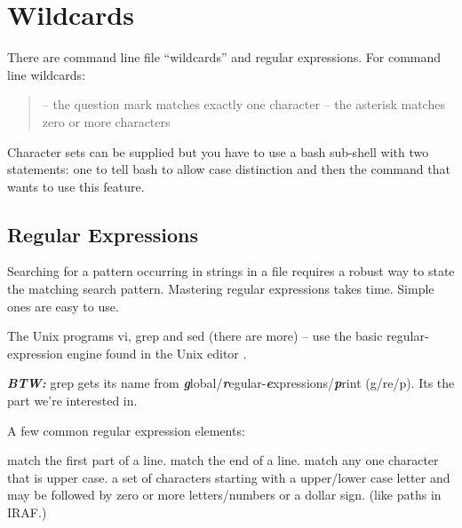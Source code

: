 
\renewcommand{\footerfilename}{extras.tex}


\section{Wildcards}

There are command line file ``wildcards'' and regular expressions. For
command line wildcards:

\begin{quote}
{\color{verbcolor}{\verb#?#}}  -- the question mark matches exactly one character
{\color{verbcolor}{\verb#*#}}  -- the asterisk matches zero or more characters
\end{quote}

Character sets can be supplied but you have to use a bash sub-shell
with two statements: one to tell bash to allow case distinction
{\color{verbcolor}{\verb#LC_ALL=C#}} and then the command that wants
to use this feature.

\begin{quote}
{\color{verbcolor}{\verb#! (export LC_ALL=C; rm [a-z]_*fits 2> /dev/null;)#}}
\end{quote}

\subsection{Regular Expressions}

Searching for a pattern occurring in strings in a file requires a robust
way to state the matching search pattern. Mastering regular expressions
takes time. Simple ones are easy to use.

The Unix programs vi, grep and sed (there are more) -- use the basic
regular-expression engine found in the Unix editor
{\color{verbcolor}{\verb#ed#}}.

\textbf{\emph{BTW:}} grep gets its name from \textbf{\emph{g}}lobal/\textbf{\emph{r}}egular-\textbf{\emph{e}}xpressions/\textbf{\emph{p}}rint (g/re/p). Its the {\color{verbcolor}{\verb#re#}} part
we're interested in.


A few common regular expression
elements:

{\color{verbcolor}{\verb#^#}} match the first part of a line.
{\color{verbcolor}{\verb#$#}} match the end of a line.
{\color{verbcolor}{\verb#[A-Z]#}} match any one character that is upper case.
{\color{verbcolor}{\verb#[A-Za-z][A-Za-z0-9$]*#}} a set of characters starting with a upper/lower
case letter and may be followed by zero or more letters/numbers or a dollar
sign. (like paths in IRAF.)

